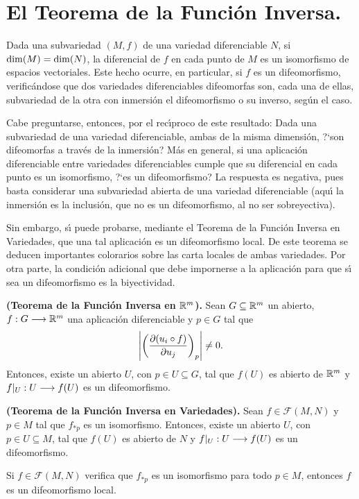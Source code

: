 \documentclass[cursovd_portada.tex]{subfiles}
\begin{document}
\section{El Teorema de la Funci\'{o}n Inversa.}
\hs Dada una subvariedad $(M,f)$ de una variedad diferenciable
$N$, si ${\rm dim}(M)={\rm dim}(N)$, la diferencial de $f$ en cada
punto de $M$ es un isomorfismo de espacios vectoriales. Este hecho
ocurre, en particular, si $f$ es un difeomorfismo,
verific\'{a}ndose que dos variedades diferenciables difeomorfas
son, cada una de ellas, subvariedad de la otra con inmersi\'{o}n
el difeomorfismo o su inverso, seg\'{u}n el caso.
\par Cabe preguntarse, entonces, por el rec\'{\i}proco de este resultado: Dada una subvariedad de una variedad
diferenciable, ambas de la misma dimensi\'{o}n, ?`son difeomorfas
a trav\'{e}s de la inmersi\'{o}n? M\'{a}s en general, si una
aplicaci\'{o}n diferenciable entre variedades diferenciables
cumple que su diferencial en cada punto es un isomorfismo, ?`es un
difeomorfismo? La respuesta es negativa, pues basta considerar una
subvariedad abierta de una variedad diferenciable (aqu\'{\i} la
inmersi\'{o}n es la inclusi\'{o}n, que no es un difeomorfismo, al
no ser sobreyectiva).
\par Sin embargo, s\'{\i} puede probarse, mediante el Teorema de la Funci\'{o}n Inversa en Variedades, que una tal aplicaci\'{o}n
es un difeomorfismo local. De este teorema se deducen importantes
colorarios sobre las carta locales de ambas variedades. Por otra
parte, la condici\'{o}n adicional que debe impornerse a la
aplicaci\'{o}n para que s\'{\i} sea un difeomorfismo es la
biyectividad.
\begin{teorema}
{\bf (Teorema de la Funci\'{o}n Inversa en $\mathbb{R}^m$).} Sean
$G\subseteq\mathbb{R}^m$ un abierto, $f:G\longrightarrow\mathbb{R}^m$ una aplicaci\'{o}n
diferenciable y $p\in G$ tal que
$$\left|\left(\displaystyle{\frac{\partial (u_i\circ f)}{\partial u_j}}\right)_{p}\right|\neq 0.$$
Entonces, existe un abierto $U$, con $p\in U\subseteq G$, tal que
$f(U)$ es abierto de $\mathbb{R}^m$ y $f|_U:U\longrightarrow f(U)$ es un
difeomorfismo.
\end{teorema}
\begin{teorema}
{\bf (Teorema de la Funci\'{o}n Inversa en Variedades).} Sean
$f\in\mathcal{F}(M,N)$ y $p\in M$ tal que $f_{*p}$ es un
isomorfismo. Entonces, existe un abierto $U$, con $p\in U\subseteq
M$, tal que $f(U)$ es abierto de $N$ y $f|_U:U\longrightarrow f(U)$ es un
difeomorfismo.
\end{teorema}
\begin{coro}
Si $f\in\mathcal{F}(M,N)$ verifica que $f_{*p}$ es un isomorfismo
para todo $p\in M$, entonces $f$ es un difeomorfismo local.
\end{coro}
\end{document}
